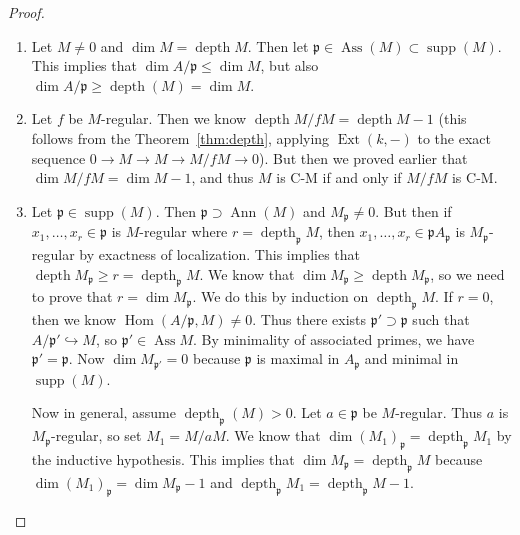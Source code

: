 \documentclass[leqno, openany]{memoir}
\theoremstyle{definition}
\theoremstyle{remark}
\theoremstyle{plain}
\theoremstyle{definition}
\theoremstyle{remark}
\newcommand{\mf}[1]{\mathfrak{#1}}
\DeclareMathOperator{\Hom}{Hom}
\DeclareMathOperator{\supp}{supp}
\DeclareMathOperator{\Ext}{Ext}
\DeclareMathOperator{\Ann}{Ann}
\DeclareMathOperator{\Ass}{Ass}
\DeclareMathOperator{\dpth}{depth}
\begin{document}
\begin{proof} \begin{enumerate} \item Let $M \neq 0$ and $\dim M = \dpth M$.
    Then let $\mf{p} \in \Ass(M) \subset \supp(M)$. This implies that $\dim
    A/\mf{p} \leq \dim M$, but also $\dim A/\mf{p} \geq \dpth(M) = \dim M$.
\item Let $f$ be $M$-regular. Then we know $\dpth M/fM = \dpth M - 1$ (this
    follows from the Theorem~\ref{thm:depth}, applying $\Ext(k,-)$ to the exact
    sequence $0 \to M \to M \to M/fM \to 0$). But then we proved earlier that
    $\dim M/fM = \dim M - 1$, and thus $M$ is C-M if and only if $M/fM$ is C-M.
\item Let $\mf{p} \in \supp(M)$. Then $\mf{p} \supset \Ann(M)$ and $M_{\mf{p}}
    \neq 0$. But then if $x_1, \ldots, x_r \in \mf{p}$ is $M$-regular where $r
    = \dpth_{\mf{p}} M$, then $x_1, \ldots, x_r \in \mf{p} A_{\mf{p}}$ is
    $M_{\mf{p}}$-regular by exactness of localization. This implies that $\dpth
    M_{\mf{p}} \geq r = \dpth_{\mf{p}} M$. We know that $\dim M_{\mf{p}} \geq
    \dpth M_{\mf{p}}$, so we need to prove that $r = \dim M_{\mf{p}}$. We do
    this by induction on $\dpth_{\mf{p}} M$. If $r = 0$, then we know
    $\Hom(A/\mf{p}, M) \neq 0$. Thus there exists $\mf{p}' \supset \mf{p}$ such
    that $A/\mf{p}' \hookrightarrow M$, so $\mf{p}' \in \Ass M$. By minimality
    of associated primes, we have $\mf{p}' = \mf{p}$. Now $\dim M_{\mf{p}'} =
    0$ because $\mf{p}$ is maximal in $A_{\mf{p}}$ and minimal in $\supp(M)$.

            Now in general, assume $\dpth_{\mf{p}}(M) > 0$. Let $a \in \mf{p}$
    be $M$-regular. Thus $a$ is $M_{\mf{p}}$-regular, so set $M_1 = M/aM$. We
    know that $\dim (M_1)_{\mf{p}} = \dpth_{\mf{p}} M_1$ by the inductive
    hypothesis. This implies that $\dim M_{\mf{p}} = \dpth_{\mf{p}} M$ because
    $\dim (M_1)_{\mf{p}} = \dim M_{\mf{p}} - 1$ and $\dpth_{\mf{p}} M_1 =
    \dpth_{\mf{p}} M - 1$. \qedhere \end{enumerate} \end{proof}
\end{document}
